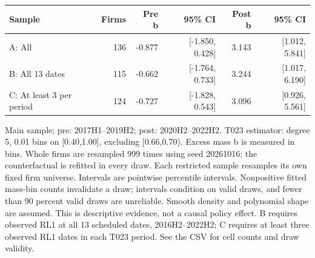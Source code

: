 \begin{threeparttable}
\begin{tabular}{lrrrrr}
\toprule
Sample & Firms & Pre b & 95\% CI & Post b & 95\% CI \\
\midrule
A: All & 136 & -0.877 & [-1.850, 0.428] & 3.143 & [1.012, 5.841] \\
B: All 13 dates & 115 & -0.662 & [-1.764, 0.733] & 3.244 & [1.017, 6.190] \\
C: At least 3 per period & 124 & -0.727 & [-1.828, 0.543] & 3.096 & [0.926, 5.561] \\
\bottomrule
\end{tabular}
\begin{tablenotes}[flushleft]
\footnotesize
\item Main sample; pre: 2017H1--2019H2; post: 2020H2--2022H2. T023 estimator: degree 5, 0.01 bins on [0.40,1.00], excluding [0.66,0.70). Excess mass b is measured in bins. Whole firms are resampled 999 times using seed 20261016; the counterfactual is refitted in every draw. Each restricted sample resamples its own fixed firm universe. Intervals are pointwise percentile intervals. Nonpositive fitted mass-bin counts invalidate a draw; intervals condition on valid draws, and fewer than 90 percent valid draws are unreliable. Smooth density and polynomial shape are assumed. This is descriptive evidence, not a causal policy effect. B requires observed RL1 at all 13 scheduled dates, 2016H2--2022H2; C requires at least three observed RL1 dates in each T023 period. See the CSV for cell counts and draw validity.
\end{tablenotes}
\end{threeparttable}
